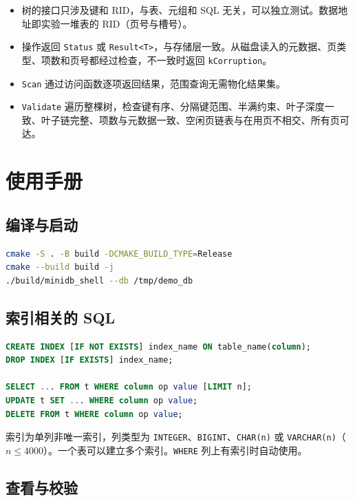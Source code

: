 \documentclass[11pt,a4paper]{ctexart}
\newcommand{\code}[1]{\texttt{#1}}
\begin{document}
\begin{itemize}
  \item 树的接口只涉及键和 RID，与表、元组和 SQL 无关，可以独立测试。数据地址即实验一堆表的 RID（页号与槽号）。
  \item 操作返回 \code{Status} 或 \code{Result<T>}，与存储层一致。从磁盘读入的元数据、页类型、项数和页号都经过检查，不一致时返回 \code{kCorruption}。
  \item \code{Scan} 通过访问函数逐项返回结果，范围查询无需物化结果集。
  \item \code{Validate} 遍历整棵树，检查键有序、分隔键范围、半满约束、叶子深度一致、叶子链完整、项数与元数据一致、空闲页链表与在用页不相交、所有页可达。
\end{itemize}

\section{使用手册}

\subsection{编译与启动}

\begin{lstlisting}[language=bash,style=plain]
cmake -S . -B build -DCMAKE_BUILD_TYPE=Release
cmake --build build -j
./build/minidb_shell --db /tmp/demo_db
\end{lstlisting}

\subsection{索引相关的 SQL}

\begin{lstlisting}[language=SQL,style=plain]
CREATE INDEX [IF NOT EXISTS] index_name ON table_name(column);
DROP INDEX [IF EXISTS] index_name;

SELECT ... FROM t WHERE column op value [LIMIT n];
UPDATE t SET ... WHERE column op value;
DELETE FROM t WHERE column op value;
\end{lstlisting}

索引为单列非唯一索引，列类型为 \code{INTEGER}、\code{BIGINT}、\code{CHAR(n)} 或 \code{VARCHAR(n)}（$n \leq 4000$）。一个表可以建立多个索引。\code{WHERE} 列上有索引时自动使用。

\subsection{查看与校验}
\end{document}
